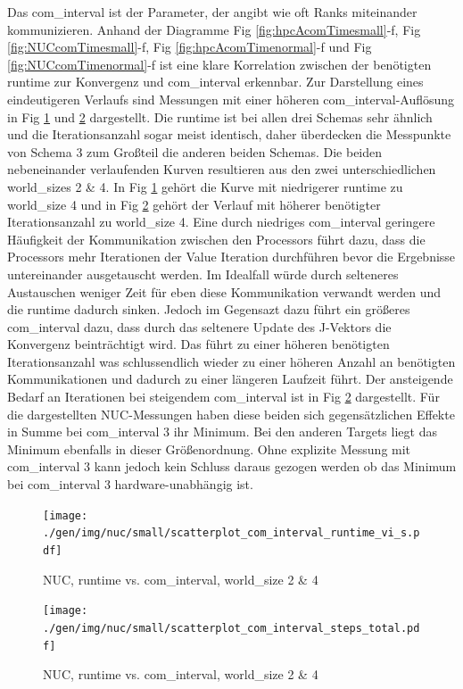 Das com\_interval ist der Parameter, der angibt wie oft Ranks miteinander kommunizieren.
Anhand der Diagramme Fig \ref{fig:hpcAcomTimesmall}-f, Fig \ref{fig:NUCcomTimesmall}-f, Fig \ref{fig:hpcAcomTimenormal}-f
und Fig \ref{fig:NUCcomTimenormal}-f
ist eine klare Korrelation zwischen der benötigten runtime zur Konvergenz und com\_interval erkennbar. Zur Darstellung eines
eindeutigeren Verlaufs sind Messungen mit einer höheren com\_interval-Auflösung in Fig \ref{fig:ScatRunCom} und \ref{fig:ScatStepCom}
dargestellt. Die runtime ist bei allen drei Schemas sehr ähnlich und die Iterationsanzahl sogar meist identisch,
daher überdecken die Messpunkte von Schema 3 zum Großteil die anderen beiden Schemas. Die beiden nebeneinander verlaufenden Kurven resultieren
aus den zwei unterschiedlichen world\_sizes 2 \& 4. In Fig \ref{fig:ScatRunCom} gehört die Kurve mit niedrigerer runtime zu world\_size 4 und
in Fig \ref{fig:ScatStepCom} gehört der Verlauf mit höherer benötigter Iterationsanzahl zu world\_size 4.
Eine durch niedriges com\_interval geringere Häufigkeit der Kommunikation zwischen den Processors führt dazu, dass die Processors
mehr Iterationen der Value Iteration durchführen bevor die Ergebnisse untereinander ausgetauscht werden.
Im Idealfall würde durch selteneres Austauschen weniger Zeit für eben diese Kommunikation verwandt werden und die runtime dadurch sinken.
Jedoch im Gegensazt dazu führt ein größeres com\_interval dazu, dass durch das seltenere
Update des J-Vektors die Konvergenz beinträchtigt wird. Das führt zu einer höheren benötigten Iterationsanzahl was schlussendlich
wieder zu einer höheren Anzahl an benötigten Kommunikationen und dadurch
zu einer längeren Laufzeit führt. Der ansteigende Bedarf an Iterationen bei steigendem com\_interval ist in Fig \ref{fig:ScatStepCom}
dargestellt.
Für die dargestellten NUC-Messungen haben diese beiden sich gegensätzlichen Effekte in Summe bei com\_interval 3 ihr Minimum.
Bei den anderen Targets liegt das Minimum ebenfalls in dieser Größenordnung. Ohne explizite Messung mit com\_interval 3 kann jedoch
kein Schluss daraus gezogen werden ob das Minimum bei com\_interval 3 hardware-unabhängig ist.

\begin{figure}[h]
\texttt{[image: ./gen/img/nuc/small/scatterplot\_com\_interval\_runtime\_vi\_s.pdf]}
\caption{NUC, runtime vs. com\_interval, world\_size 2 \& 4}
\label{fig:ScatRunCom}
\end{figure}

\begin{figure}[h]
\texttt{[image: ./gen/img/nuc/small/scatterplot\_com\_interval\_steps\_total.pdf]}
\caption{NUC, runtime vs. com\_interval, world\_size 2 \& 4}
\label{fig:ScatStepCom}
\end{figure}

